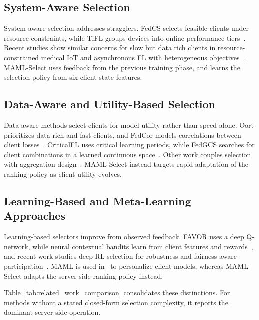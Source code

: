 \documentclass[journal]{IEEEtran}
\theoremstyle{remark}
\newcommand{\revision}[1]{#1}
\begin{document}
\subsection{System-Aware Selection}
System-aware selection addresses stragglers. FedCS selects feasible clients under resource constraints, while TiFL groups devices into online performance tiers~\cite{nishio2019client,chai2020tifl}. Recent studies show similar concerns for slow but data rich clients in resource-constrained medical IoT and asynchronous FL with heterogeneous objectives~\cite{tapwal2026stragglers,forootani2026asynchronous}. MAML-Select uses feedback from the previous training phase, and learns the selection policy from six client-state features. %

\subsection{Data-Aware and Utility-Based Selection}
Data-aware methods select clients for model utility rather than speed alone. Oort prioritizes data-rich and fast clients, and FedCor models correlations between client losses~\cite{lai2021oort,tang2022fedcor}. CriticalFL uses critical learning periods, while FedGCS searches for client combinations in a learned continuous space~\cite{yan2023criticalfl,ning2024fedgcs}. Other work couples selection with aggregation design~\cite{xu2024federated,tran2026fedimp}. MAML-Select instead targets rapid adaptation of the ranking policy as client utility evolves.

\subsection{Learning-Based and Meta-Learning Approaches}
Learning-based selectors improve from observed feedback. FAVOR uses a deep Q-network, while neural contextual bandits learn from client features and rewards~\cite{wang2020optimizing,pan2024contextual}, and recent work studies deep-RL selection for robustness and fairness-aware participation~\cite{kazemi2026robust,arisdakessian2026vox}. MAML is used in~\cite{fallah2020personalized} to personalize client models, whereas MAML-Select adapts the server-side ranking policy instead.

\revision{Table~\ref{tab:related_work_comparison} consolidates these distinctions. For methods without a stated closed-form selection complexity, it reports the dominant server-side operation.}
\end{document}
